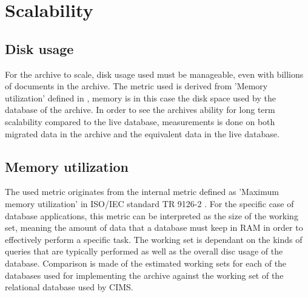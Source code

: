 %

\section{Scalability}

\subsection{Disk usage}
For the archive to scale, disk usage used must be manageable, even with billions of documents in the archive. The metric used is derived from 'Memory utilization' defined in \cite{isoInternalMetric}, memory is in this case the disk space used by the database of the archive. In order to see the archives ability for long term scalability compared to the live database, measurements is done on both migrated data in the archive and the equivalent data in the live database.              

\subsection{Memory utilization}
The used metric originates from the internal metric defined as 'Maximum memory utilization' in ISO/IEC standard TR 9126-2 \cite{isoExternalMetric}. For the specific case of database applications, this metric can be interpreted as the size of the working set, meaning the amount of data that a database must keep in RAM in order to effectively perform a specific task. The working set is dependant on the kinds of queries that are typically performed as well as the overall disc usage of the database. Comparison is made of the estimated working sets for each of the databases used for implementing the archive against the working set of the relational database used by CIMS.

